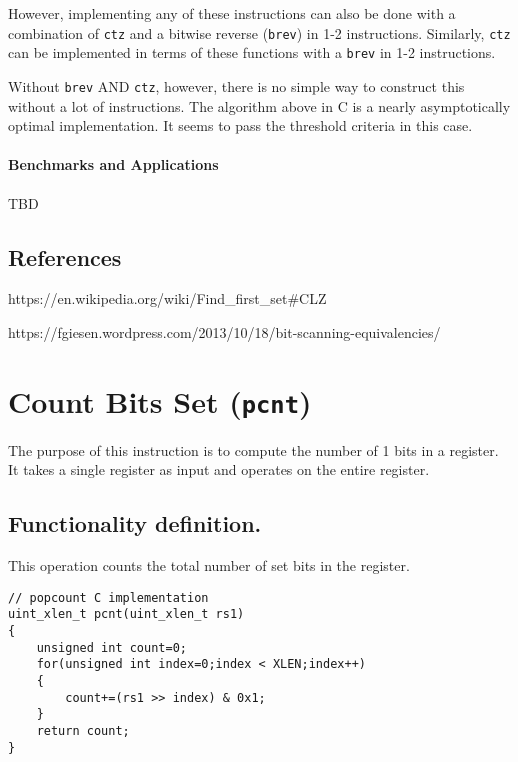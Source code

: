 However, implementing any of these instructions can also be done with a
combination of \texttt{ctz} and a bitwise reverse (\texttt{brev}) in 1-2
instructions. Similarly, \texttt{ctz} can be implemented in terms of
these functions with a \texttt{brev} in 1-2 instructions.

Without \texttt{brev} AND \texttt{ctz}, however, there is no simple way
to construct this without a lot of instructions. The algorithm above in
C is a nearly asymptotically optimal implementation. It seems to pass
the threshold criteria in this case.

\paragraph{Benchmarks and
Applications}\label{benchmarks-and-applications}

TBD

\subsection{References}\label{references}

https://en.wikipedia.org/wiki/Find\_first\_set\#CLZ

https://fgiesen.wordpress.com/2013/10/18/bit-scanning-equivalencies/

\section{\texorpdfstring{Count Bits Set
(\texttt{pcnt})}{Count Bits Set (pcnt)}}\label{count-bits-set-pcnt}

The purpose of this instruction is to compute the number of 1 bits in a
register. It takes a single register as input and operates on the entire
register.

\subsection{Functionality
definition.}\label{functionality-definition.}

This operation counts the total number of set bits in the register.

\begin{verbatim}
// popcount C implementation
uint_xlen_t pcnt(uint_xlen_t rs1)
{
    unsigned int count=0;
    for(unsigned int index=0;index < XLEN;index++)
    {
        count+=(rs1 >> index) & 0x1;
    }
    return count;
}
\end{verbatim}

